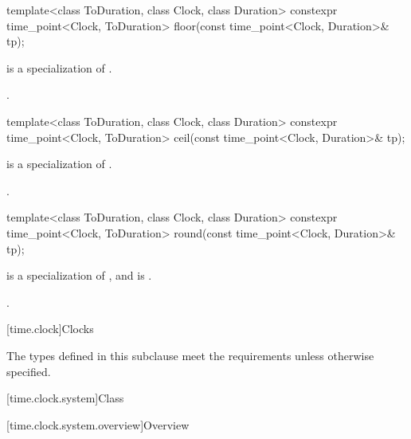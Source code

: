 %
\begin{itemdecl}
template<class ToDuration, class Clock, class Duration>
  constexpr time_point<Clock, ToDuration> floor(const time_point<Clock, Duration>& tp);
\end{itemdecl}

\begin{itemdescr}
\pnum
\constraints
{} is a specialization of .

\pnum
\returns
{}.
\end{itemdescr}

%
\begin{itemdecl}
template<class ToDuration, class Clock, class Duration>
  constexpr time_point<Clock, ToDuration> ceil(const time_point<Clock, Duration>& tp);
\end{itemdecl}

\begin{itemdescr}
\pnum
\constraints
{} is a specialization of .

\pnum
\returns
{}.
\end{itemdescr}

%
\begin{itemdecl}
template<class ToDuration, class Clock, class Duration>
  constexpr time_point<Clock, ToDuration> round(const time_point<Clock, Duration>& tp);
\end{itemdecl}

\begin{itemdescr}
\pnum
\constraints
{} is a specialization of , and
 is .

\pnum
\returns
{}.
\end{itemdescr}

[time.clock]{Clocks}

\pnum
The types defined in this subclause meet the
requirements
unless otherwise specified.

[time.clock.system]{Class }

[time.clock.system.overview]{Overview}
%

